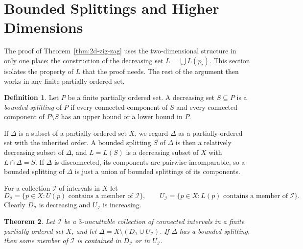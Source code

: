 \documentclass[10pt, a4paper]{article}
\theoremstyle{plain}
\newtheorem{theorem}{Theorem}[section]
\theoremstyle{definition}
\newtheorem{definition}[theorem]{Definition}
\newcommand{\I}{\mathcal{I}}
\begin{document}
\section{Bounded Splittings and Higher Dimensions}

The proof of Theorem~\ref{thm:2d-zig-zag} uses the two-dimensional structure in only
one place: the construction of the decreasing set $L=\bigcup L(p_i)$. This section
isolates the property of $L$ that the proof needs. The rest of the argument then
works in any finite partially ordered set.

\begin{definition}\label{def:bounded-splitting}
  Let $P$ be a finite partially ordered set. A decreasing set $S\subseteq P$ is a
  \emph{bounded splitting} of $P$ if every connected component of $S$ and every
  connected component of $P\setminus S$ has an upper bound or a lower bound in $P$.
\end{definition}

If $\Delta$ is a subset of a partially ordered set $X$, we regard $\Delta$ as a
partially ordered set with the inherited order. A bounded splitting $S$ of $\Delta$ is
then a relatively decreasing subset of $\Delta$, and $L=L(S)$ is a decreasing subset
of $X$ with $L\cap\Delta=S$. If $\Delta$ is disconnected, its components are pairwise
incomparable, so a bounded splitting of $\Delta$ is just a union of bounded splittings
of its components.

For a collection $\I$ of intervals in $X$ let
\[
  D_\I=\{p\in X : U(p) \text{ contains a member of } \I\},\qquad
  U_\I=\{p\in X : L(p) \text{ contains a member of } \I\}.
\]
Clearly $D_\I$ is decreasing and $U_\I$ is increasing.

\begin{theorem}\label{thm:bounded-splitting-three}
  Let $\I$ be a $3$-uncuttable collection of connected intervals in a finite partially
  ordered set $X$, and let $\Delta=X\setminus(D_\I\cup U_\I)$. If $\Delta$ has a
  bounded splitting, then some member of $\I$ is contained in $D_\I$ or in $U_\I$.
\end{theorem}
\end{document}
